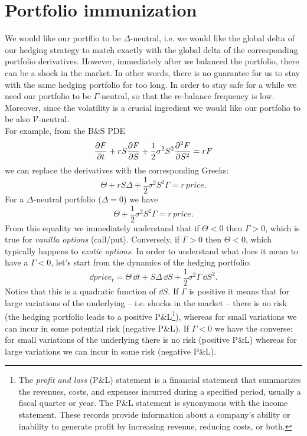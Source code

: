 \section{Portfolio immunization}
We would like our portflio to be $\Delta$-neutral, i.e. we would like the global delta of our hedging strategy to match exactly with the global delta of the corresponding portfolio derivatives. However, immediately after we balanced the portfolio, there can be a shock in the market. In other words, there is no guarantee for us to stay with the same hedging portfolio for too long. In order to stay safe for a while we need our portfolio to be $\Gamma$-neutral, so that the re-balance frequency is low. Moreover, since the volatility is a crucial ingredient we would like our portfolio to be also $\mathcal{V}$-neutral.\\
For example, from the B\&S PDE
\begin{equation}
    \pdv{F}{t} + rS\pdv{F}{S} + \frac{1}{2}\sigma^2S^2\pdv[2]{F}{S} = rF
\end{equation}
we can replace the derivatives with the corresponding Greeks:
\begin{equation}
    \Theta + rS\Delta + \frac{1}{2}\sigma^2S^2 \Gamma = r\, price.
\end{equation}
For a $\Delta$-neutral portfolio ($\Delta = 0$) we have
\begin{equation}
    \Theta + \frac{1}{2}\sigma^2S^2 \Gamma = r\, price.
\end{equation}
From this equality we immediately understand that if $\Theta<0$ then $\Gamma>0$, which is true for \emph{vanilla options} (call/put). Conversely, if $\Gamma>0$ then $\Theta<0$, which typically happens to \emph{exotic options}. In order to understand what does it mean to have a $\Gamma<0$, let's start from the dynamics of the hedging portfolio:
\begin{equation}
    \dd price_t = \Theta\,\dd t + S\Delta\,\dd S + \frac{1}{2}\sigma^2\Gamma\,\dd S^2.
\end{equation}
Notice that this is a quadratic function of $\dd S$. If $\Gamma$ is positive it means that for large variations of the underlying -- i.e. shocks in the market -- there is no risk (the hedging portfolio leads to a positive P\&L\footnote{The \emph{profit and loss} (P\&L) statement is a financial statement that summarizes the revenues, costs, and expenses incurred during a specified period, usually a fiscal quarter or year. The P\&L statement is synonymous with the income statement. These records provide information about a company's ability or inability to generate profit by increasing revenue, reducing costs, or both.}), whereas for small variations we can incur in some potential risk (negative P\&L). If $\Gamma<0$ we have the converse: for small variations of the underlying there is no risk (positive P\&L) whereas for large variations we can incur in some risk (negative P\&L).
